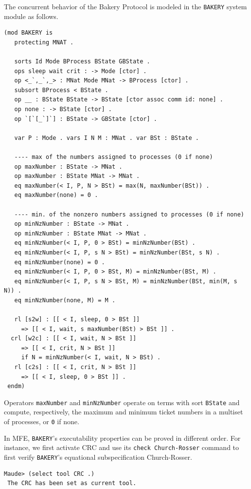\documentclass{llncs}
\begin{document}
The concurrent behavior of the Bakery Protocol is modeled 
in the \verb"BAKERY" system module as follows. %

\begin{lstlisting}[style=AMMA, language=Maude, numbers=none]
 (mod BAKERY is 
   protecting MNAT . 

   sorts Id Mode BProcess BState GBState .
   ops sleep wait crit : -> Mode [ctor] .
   op <_`,_`,_> : MNat Mode MNat -> BProcess [ctor] .
   subsort BProcess < BState .
   op __ : BState BState -> BState [ctor assoc comm id: none] .
   op none : -> BState [ctor] .
   op `[`[_`]`] : BState -> GBState [ctor] .

   var P : Mode . vars I N M : MNat . var BSt : BState .

   ---- max of the numbers assigned to processes (0 if none)
   op maxNumber : BState -> MNat .
   op maxNumber : BState MNat -> MNat .
   eq maxNumber(< I, P, N > BSt) = max(N, maxNumber(BSt)) .
   eq maxNumber(none) = 0 .

   ---- min. of the nonzero numbers assigned to processes (0 if none)
   op minNzNumber : BState -> MNat .
   op minNzNumber : BState MNat -> MNat .
   eq minNzNumber(< I, P, 0 > BSt) = minNzNumber(BSt) .
   eq minNzNumber(< I, P, s N > BSt) = minNzNumber(BSt, s N) .
   eq minNzNumber(none) = 0 .
   eq minNzNumber(< I, P, 0 > BSt, M) = minNzNumber(BSt, M) .
   eq minNzNumber(< I, P, s N > BSt, M) = minNzNumber(BSt, min(M, s N)) .
   eq minNzNumber(none, M) = M .

   rl [s2w] : [[ < I, sleep, 0 > BSt ]] 
     => [[ < I, wait, s maxNumber(BSt) > BSt ]] .
  crl [w2c] : [[ < I, wait, N > BSt ]] 
     => [[ < I, crit, N > BSt ]] 
     if N = minNzNumber(< I, wait, N > BSt) .
   rl [c2s] : [[ < I, crit, N > BSt ]] 
     => [[ < I, sleep, 0 > BSt ]] .
 endm)
\end{lstlisting}

Operators \verb"maxNumber" and \verb"minNzNumber" operate on terms
with sort \verb"BState" and compute, respectively, the maximum and
minimum ticket numbers in a multiset of processes, or \verb"0" if none.

In MFE, \verb"BAKERY"'s executability properties can be proved in
different order. For instance, we first activate CRC and use its
\verb"check Church-Rosser" command to first verify \verb"BAKERY"'s
equational subspecification Church-Rosser.

\begin{lstlisting}[style=AMMA, language=MaudeCommand, numbers=none]
 Maude> (select tool CRC .)
 The CRC has been set as current tool.
\end{lstlisting}
\end{document}
